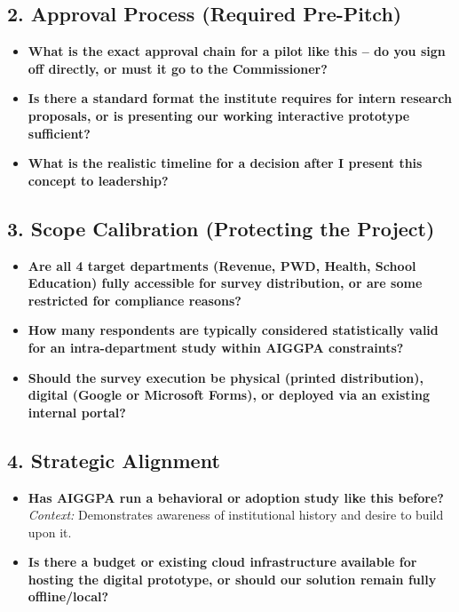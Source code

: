 \documentclass[12pt,a4paper]{article}
\begin{document}
\vspace{1em}

\subsection*{{\color{yellowalert} \textbf{2. Approval Process (Required Pre-Pitch)}}}
\begin{itemize}[leftmargin=*, label={\color{yellowalert} $\blacksquare$}]
    \item \textbf{What is the exact approval chain for a pilot like this -- do you sign off directly, or must it go to the Commissioner?}
    \item \textbf{Is there a standard format the institute requires for intern research proposals, or is presenting our working interactive prototype sufficient?}
    \item \textbf{What is the realistic timeline for a decision after I present this concept to leadership?}
\end{itemize}

\vspace{1em}

\subsection*{{\color{greenalert} \textbf{3. Scope Calibration (Protecting the Project)}}}
\begin{itemize}[leftmargin=*, label={\color{greenalert} $\blacksquare$}]
    \item \textbf{Are all 4 target departments (Revenue, PWD, Health, School Education) fully accessible for survey distribution, or are some restricted for compliance reasons?}
    \item \textbf{How many respondents are typically considered statistically valid for an intra-department study within AIGGPA constraints?}
    \item \textbf{Should the survey execution be physical (printed distribution), digital (Google or Microsoft Forms), or deployed via an existing internal portal?}
\end{itemize}

\vspace{1em}

\subsection*{{\color{greyalert} \textbf{4. Strategic Alignment}}}
\begin{itemize}[leftmargin=*, label={\color{greyalert} $\blacksquare$}]
    \item \textbf{Has AIGGPA run a behavioral or adoption study like this before?}
    \vspace{0.2em} \\
    \textit{Context:} Demonstrates awareness of institutional history and desire to build upon it.
    
    \item \textbf{Is there a budget or existing cloud infrastructure available for hosting the digital prototype, or should our solution remain fully offline/local?}
\end{itemize}
\end{document}
